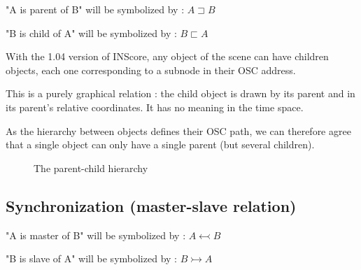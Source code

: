 \documentclass[a4paper]{article}
\newcommand{\parent}			{\sqsupset}
\newcommand{\child}			{\sqsubset}
\newcommand{\master}			{\leftarrowtail}
\newcommand{\slave}			{\rightarrowtail}
\begin{document}
"A is parent of B" will be symbolized by : $A \parent B$

"B is child of A" will be symbolized by : $B \child A$

\bigskip

With the 1.04 version of INScore, any object of the scene can have children objects, each one corresponding to a subnode in their OSC address. 

This is a purely graphical relation : the child object is drawn by its parent and in its parent's relative coordinates. It has no meaning in the time space. 

As the hierarchy between objects defines their OSC path, we can therefore agree that a single object can only have a single parent (but several children). 

\bigskip

\begin{figure}[h]
\begin{center}

 \caption{The parent-child hierarchy}
 \label{fig:hierarchy}

\end{center}
\end{figure}

\subsection{Synchronization (master-slave relation)}\label{subsec:sync}

"A is master of B" will be symbolized by : $A \master B$

"B is slave of A" will be symbolized by : $B \slave A$
\bigskip
\end{document}
